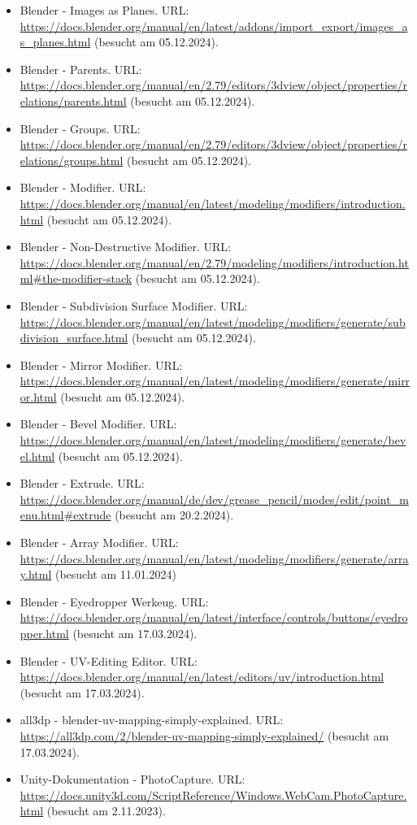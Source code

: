 \begin{itemize}
    \item Blender - Images as Planes. URL: \url{https://docs.blender.org/manual/en/latest/addons/import_export/images_as_planes.html} (besucht am 05.12.2024).
    \item Blender - Parents. URL: \url{https://docs.blender.org/manual/en/2.79/editors/3dview/object/properties/relations/parents.html} (besucht am 05.12.2024).
    \item Blender - Groups. URL: \url{https://docs.blender.org/manual/en/2.79/editors/3dview/object/properties/relations/groups.html} (besucht am 05.12.2024).
    \item Blender - Modifier. URL: \url{https://docs.blender.org/manual/en/latest/modeling/modifiers/introduction.html} (besucht am 05.12.2024).
    \item Blender - Non-Destructive Modifier. URL: \url{https://docs.blender.org/manual/en/2.79/modeling/modifiers/introduction.html#the-modifier-stack} (besucht am 05.12.2024).
    \item Blender - Subdivision Surface Modifier. URL: \url{https://docs.blender.org/manual/en/latest/modeling/modifiers/generate/subdivision_surface.html} (besucht am 05.12.2024).
    \item Blender - Mirror Modifier. URL: \url{https://docs.blender.org/manual/en/latest/modeling/modifiers/generate/mirror.html} (besucht am 05.12.2024).
    \item Blender - Bevel Modifier. URL: \url{https://docs.blender.org/manual/en/latest/modeling/modifiers/generate/bevel.html} (besucht am 05.12.2024).
    \item Blender - Extrude. URL: \url{https://docs.blender.org/manual/de/dev/grease_pencil/modes/edit/point_menu.html#extrude} (besucht am 20.2.2024).
    \item Blender - Array Modifier. URL: \url{https://docs.blender.org/manual/en/latest/modeling/modifiers/generate/array.html} (besucht am 11.01.2024)
    \item Blender - Eyedropper Werkeug. URL: \url{https://docs.blender.org/manual/en/latest/interface/controls/buttons/eyedropper.html} (besucht am 17.03.2024).
    \item Blender - UV-Editing Editor. URL: \url{https://docs.blender.org/manual/en/latest/editors/uv/introduction.html} (besucht am 17.03.2024).
    \item all3dp - blender-uv-mapping-simply-explained. URL: \url{https://all3dp.com/2/blender-uv-mapping-simply-explained/} (besucht am 17.03.2024).
    \item Unity-Dokumentation - PhotoCapture. URL:  \url{https://docs.unity3d.com/ScriptReference/Windows.WebCam.PhotoCapture.html} (besucht am 2.11.2023).

\end{itemize}

